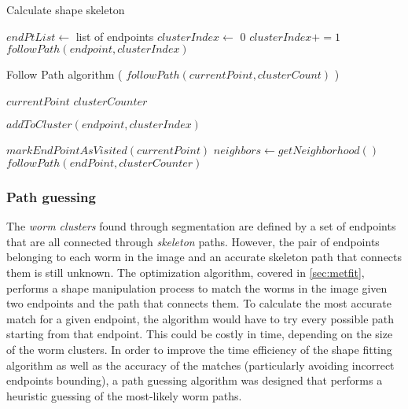 \begin{algorithm}                     
\caption{Calculate shape skeleton}         
\label{groupsegment}                    
\begin{algorithmic}                   

\STATE $endPtList \leftarrow$ list of endpoints
\STATE $clusterIndex \leftarrow$ 0
\STATE {}
\ELSE
\STATE $clusterIndex +=1$
\STATE $followPath(endpoint,clusterIndex)$
\ENDIF
\ENDFOR
\end{algorithmic}
\end{algorithm}

\begin{algorithm}                     
\caption{Follow Path algorithm ( $followPath(currentPoint,clusterCount)$ )}         
\begin{algorithmic}                   

\REQUIRE $currentPoint$
\REQUIRE $clusterCounter$

\RETURN 
\ELSE
\STATE $addToCluster(endpoint,clusterIndex)$
\ENDIF

\STATE {}
\STATE $markEndPointAsVisited(currentPoint)$
\ENDIF
\STATE $neighbors \leftarrow getNeighborhood()$
\STATE $followPath(endPoint,clusterCounter)$
\ENDFOR

\end{algorithmic}
\end{algorithm}


\subsubsection*{Path guessing}
\label{sec:pathguessing}

The \emph{worm clusters} found through segmentation are defined by a set of endpoints
that are all connected through \emph{skeleton} paths. However, the pair of 
endpoints belonging to each worm in the image and an accurate skeleton 
path that
connects them is still unknown. The optimization algorithm, covered in \ref{sec:metfit},
performs a shape manipulation process to match the worms in the image given two endpoints
and the path that connects them. To calculate the most accurate match for a 
given endpoint, the algorithm would have to try every possible path starting
from that endpoint. This could be costly in time, depending on the size of
the worm clusters. In order to improve the time efficiency of the 
shape fitting algorithm as well as the accuracy of the matches 
(particularly avoiding incorrect endpoints bounding), 
a path guessing algorithm was designed that performs a heuristic
guessing of the most-likely worm paths.\\

